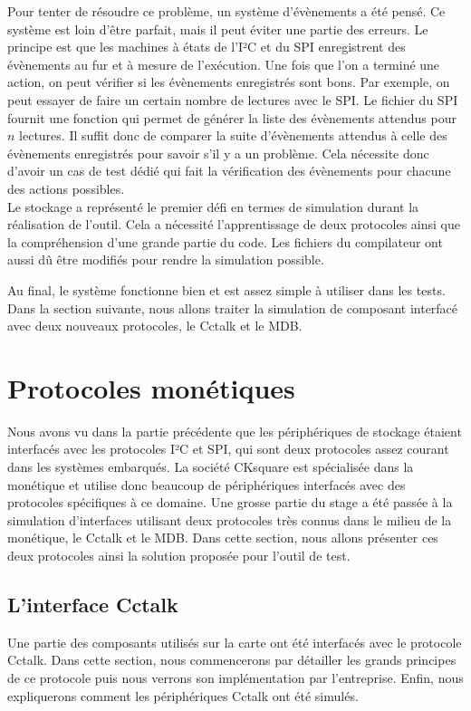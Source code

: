 \documentclass[a4paper]{article}
\begin{document}
Pour tenter de résoudre ce problème, un système d'évènements a été pensé. Ce
système est loin d'être parfait, mais il peut éviter une partie des erreurs. Le
principe est que les machines à états de l'I²C et du SPI enregistrent des
évènements au fur et à mesure de l'exécution. Une fois que l'on a terminé une
action, on peut vérifier si les évènements enregistrés sont bons. Par exemple, on
peut essayer de faire un certain nombre de lectures avec le SPI. Le fichier du
SPI fournit une fonction qui permet de générer la liste des évènements attendus
pour $n$ lectures. Il suffit donc de comparer la suite d'évènements attendus à
celle des évènements enregistrés pour savoir s'il y a un problème. Cela
nécessite donc d'avoir un cas de test dédié qui fait la vérification des
évènements pour chacune des actions possibles.
\\
Le stockage a représenté le premier défi en termes de simulation durant la
réalisation de l'outil. Cela a nécessité l'apprentissage de deux protocoles
ainsi que la compréhension d'une grande partie du code. Les fichiers du
compilateur ont aussi dû être modifiés pour rendre la simulation possible.

Au final, le système fonctionne bien et est assez simple à utiliser dans les
tests. Dans la section suivante, nous allons traiter la simulation de composant
interfacé avec deux nouveaux protocoles, le Cctalk et le MDB.
\section{Protocoles monétiques}%

Nous avons vu dans la partie précédente que les périphériques de stockage
étaient interfacés avec les protocoles I²C et SPI, qui sont deux protocoles assez
courant dans les systèmes embarqués. La société CKsquare est spécialisée dans la
monétique et utilise donc beaucoup de périphériques interfacés avec des
protocoles spécifiques à ce domaine. Une grosse partie du stage a été passée à
la simulation d'interfaces utilisant deux protocoles très connus dans le milieu
de la monétique, le Cctalk et le MDB. Dans cette section, nous allons présenter
ces deux protocoles ainsi la solution proposée pour l'outil de test.

\subsection{L'interface Cctalk}%
\label{interfacecctalk}

Une partie des composants utilisés sur la carte ont été interfacés avec le
protocole Cctalk. Dans cette section, nous commencerons par détailler les grands
principes de ce protocole puis nous verrons son implémentation par l'entreprise.
Enfin, nous expliquerons comment les périphériques Cctalk ont été simulés.
\end{document}
